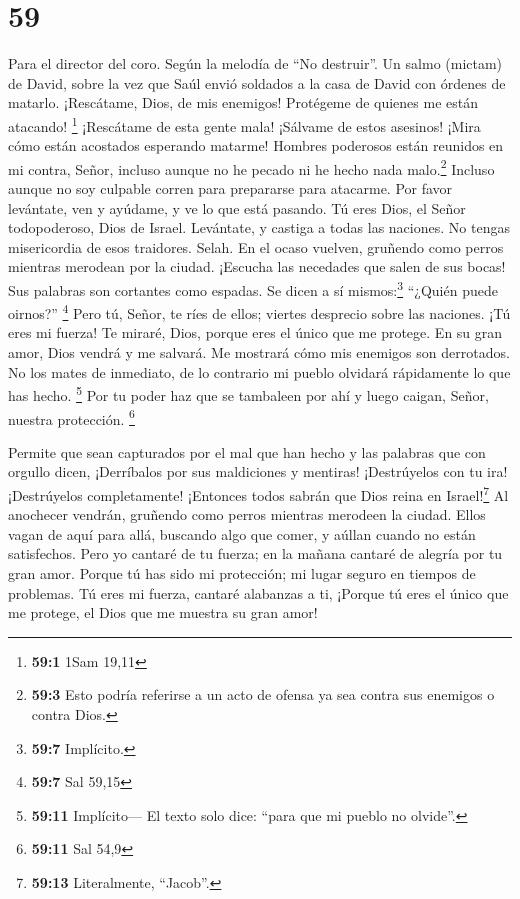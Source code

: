 \hypertarget{section-58}{%
\section{59}\label{section-58}}

Para el director del coro. Según la melodía de ``No destruir''. Un salmo
(mictam) de David, sobre la vez que Saúl envió soldados a la casa de
David con órdenes de matarlo.  ¡Rescátame, Dios, de mis
enemigos! Protégeme de quienes me están atacando! \footnote{\textbf{59:1}
  1Sam 19,11}  ¡Rescátame de esta gente mala! ¡Sálvame de
estos asesinos!  ¡Mira cómo están acostados esperando
matarme! Hombres poderosos están reunidos en mi contra, Señor, incluso
aunque no he pecado ni he hecho nada malo.\footnote{\textbf{59:3} Esto
  podría referirse a un acto de ofensa ya sea contra sus enemigos o
  contra Dios.}  Incluso aunque no soy culpable corren
para prepararse para atacarme. Por favor levántate, ven y ayúdame, y ve
lo que está pasando.  Tú eres Dios, el Señor todopoderoso,
Dios de Israel. Levántate, y castiga a todas las naciones. No tengas
misericordia de esos traidores. Selah.  En el ocaso
vuelven, gruñendo como perros mientras merodean por la ciudad.
 ¡Escucha las necedades que salen de sus bocas! Sus
palabras son cortantes como espadas. Se dicen a sí mismos:\footnote{\textbf{59:7}
  Implícito.} ``¿Quién puede oirnos?'' \footnote{\textbf{59:7} Sal 59,15}
 Pero tú, Señor, te ríes de ellos; viertes desprecio sobre
las naciones.  ¡Tú eres mi fuerza! Te miraré, Dios, porque
eres el único que me protege.  En su gran amor, Dios
vendrá y me salvará. Me mostrará cómo mis enemigos son derrotados.
 No los mates de inmediato, de lo contrario mi pueblo
olvidará rápidamente lo que has hecho. \footnote{\textbf{59:11}
  Implícito--- El texto solo dice: ``para que mi pueblo no olvide''.}
Por tu poder haz que se tambaleen por ahí y luego caigan, Señor, nuestra
protección. \footnote{\textbf{59:11} Sal 54,9}

 Permite que sean capturados por el mal que han hecho y
las palabras que con orgullo dicen, ¡Derríbalos por sus maldiciones y
mentiras!  ¡Destrúyelos con tu ira! ¡Destrúyelos
completamente! ¡Entonces todos sabrán que Dios reina en
Israel!\footnote{\textbf{59:13} Literalmente, ``Jacob''.}
 Al anochecer vendrán, gruñendo como perros mientras
merodeen la ciudad.  Ellos vagan de aquí para allá,
buscando algo que comer, y aúllan cuando no están satisfechos.
 Pero yo cantaré de tu fuerza; en la mañana cantaré de
alegría por tu gran amor. Porque tú has sido mi protección; mi lugar
seguro en tiempos de problemas.  Tú eres mi fuerza,
cantaré alabanzas a ti, ¡Porque tú eres el único que me protege, el Dios
que me muestra su gran amor!

